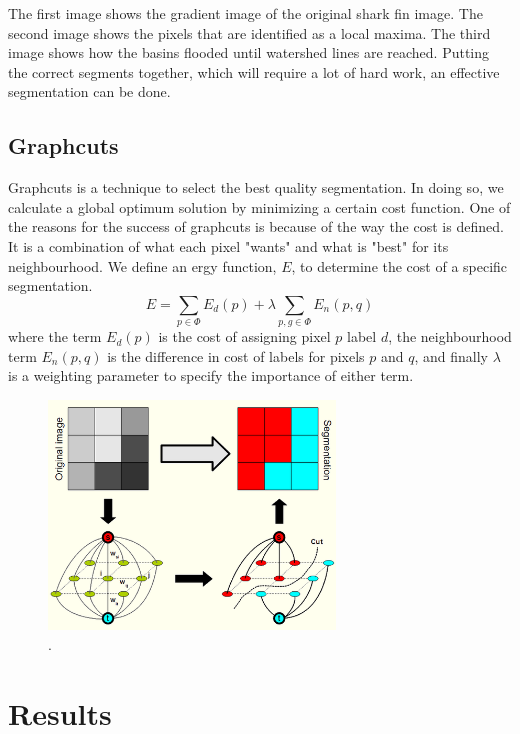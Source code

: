 \documentclass[a4paper,10pt]{article}
\begin{document}
\noindent The first image shows the gradient image of the original shark fin
image.  The second image shows the pixels that are identified as a local maxima.
 The third image shows how the basins flooded until watershed lines are reached.
 Putting the correct segments together, which will require a lot of hard work,
an effective segmentation can be done.

\subsection{Graphcuts}
Graphcuts is a technique to select the best quality segmentation.  In doing so,
we calculate a global optimum solution by minimizing a certain 
cost function.  One of the reasons for the success of graphcuts is because of
the way the cost is defined.  It is a combination of what each pixel
"wants" and what is "best" for its neighbourhood.  We define an ergy function,
$E$, to determine the cost of a specific segmentation.
\[
 E = \sum_{p \in \Phi}E_d(p) + \lambda\sum_{p,g \in \Phi}E_n(p, q)
\]
where the term $E_d(p)$ is the cost of assigning pixel $p$ label $d$, the
neighbourhood term $E_n(p, q)$ is the difference in cost of labels for pixels
$p$ 
and $q$, and finally $\lambda$ is a weighting parameter to specify the
importance of either term.

\begin{figure}[H]
 \centering
 \includegraphics[width=3in]{graphcut.jpg}
 \caption{.}
\end{figure}


\newpage
\section{Results}
\subsection{}


\subsection{}
\end{document}
